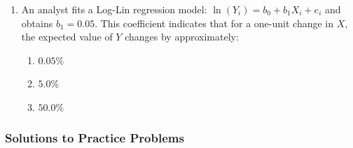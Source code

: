 \begin{enumerate}
	\item An analyst fits a Log-Lin regression model: $\ln(Y_i) = b_0 + b_1 X_i + e_i$ and obtains $b_1 = 0.05$. This coefficient indicates that for a one-unit change in $X$, the expected value of $Y$ changes by approximately:
	      \begin{enumerate}[label=\Alph*.]
		      \item $0.05\%$
		      \item $5.0\%$
		      \item $50.0\%$
	      \end{enumerate}
\end{enumerate}

\subsubsection{Solutions to Practice Problems}
\label{subsec:app_Solutions_M10}

